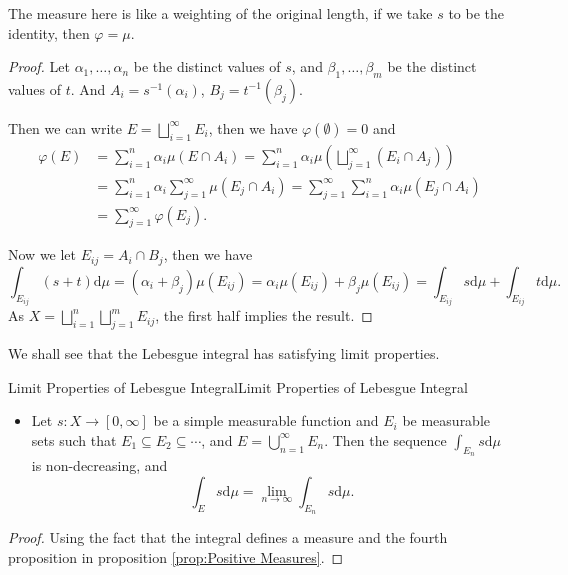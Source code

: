 \documentclass[../main.tex]{subfiles}
\begin{document}
The measure here is like a weighting of the original length, if we take $s$ to be the identity, then $\varphi = \mu$.
\begin{proof}
	Let $\alpha_1, \ldots ,\alpha_n$ be the distinct values of $s$, and $\beta_1, \ldots ,\beta_m$ be the distinct values of $t$. And $A_i = s^{-1}(\alpha_i)$, $B_j = t^{-1}(\beta_j)$.

	Then we can write $E = \bigsqcup_{i=1}^\infty E_i$, then we have $\varphi(\emptyset ) = 0$ and
\begin{equation*}
\begin{aligned}
	\varphi(E) &= \sum_{i=1}^n \alpha_i \mu(E \cap A_i) = \sum_{i=1}^n \alpha_i \mu\left(\bigsqcup_{j=1}^\infty (E_i \cap A_j)\right) \\
		   &= \sum_{i=1}^n \alpha_i \sum_{j=1}^\infty \mu(E_j \cap A_i) = \sum_{j=1}^\infty \sum_{i=1}^n \alpha_i \mu(E_j \cap A_i) \\
		   &= \sum_{j=1}^\infty \varphi(E_j).
\end{aligned}
\end{equation*}

Now we let $E_{ij} = A_i \cap B_j$, then we have
\begin{equation*}
	\int_{E_{ij}} (s+t) \mathrm{d} \mu = (\alpha_i + \beta_j) \mu(E_{ij}) = \alpha_i \mu(E_{ij}) + \beta_j \mu(E_{ij}) = \int_{E_{ij}} s \mathrm{d} \mu + \int_{E_{ij}} t \mathrm{d} \mu.
\end{equation*}
As $X = \bigsqcup_{i=1}^n \bigsqcup_{j=1}^m E_{ij}$, the first half implies the result.
\end{proof}

We shall see that the Lebesgue integral has satisfying limit properties.

\begin{proposition}{Limit Properties of Lebesgue Integral}{Limit Properties of Lebesgue Integral}
\begin{itemize}
	\item Let $s: X \rightarrow [0,\infty ]$ be a simple measurable function and $E_i$ be measurable sets such that $E_1 \subseteq E_2 \subseteq \cdots $, and $E = \bigcup_{n=1}^{\infty } E_n$. Then the sequence $\int_{E_n} s \mathrm{d} \mu$ is non-decreasing, and
	\begin{equation*}
		\int_E s \mathrm{d} \mu = \lim_{n\rightarrow \infty } \int_{E_n} s \mathrm{d} \mu.
	\end{equation*}
\end{itemize}
\end{proposition}
\begin{proof}
	Using the fact that the integral defines a measure and the fourth proposition in proposition \ref{prop:Positive Measures}.
\end{proof}
\end{document}
